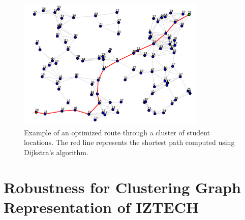 \begin{figure}[!htbp]
\centering
\includegraphics[width=0.8\textwidth]{img/shortest_path}
\caption{Example of an optimized route through a cluster of student locations. The red line represents the shortest path computed using Dijkstra's algorithm.}
\label{fig:route_optimization}
\end{figure}

\section{Robustness for Clustering Graph Representation of IZTECH}
\label{sec:robustness}




